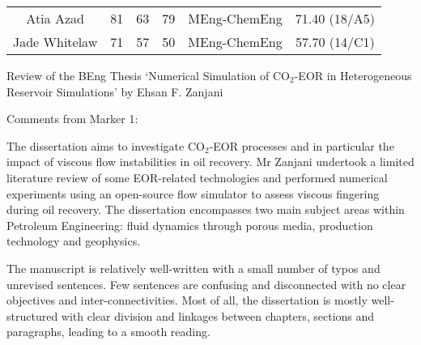\documentclass[14pt,twoside]{report}
\begin{document}
{\begin{landscape}
\begin{tabular}{||c| c c c |c| c||}
Atia Azad                  &        81                    &               63                          &         79                &   MEng-ChemEng   &   71.40 (18/A5)  \\
Jade Whitelaw              &        71                    &               57                          &         50                &   MEng-ChemEng   &   57.70 (14/C1)  \\
\hline\hline
\end{tabular}
    \end{landscape}
    \clearpage%
}




\vfill

\clearpage





\bigskip

\begin{center}
  {\Large Review of the BEng Thesis `Numerical Simulation of CO$_{2}$-EOR in Heterogeneous Reservoir Simulations' by Ehsan F. Zanjani}
\end{center}

\noindent
    {\Large Comments from Marker 1:}
    
The dissertation aims to investigate CO$_{2}$-EOR processes and in particular the impact of viscous flow instabilities in oil recovery. Mr Zanjani undertook a limited literature review of some EOR-related technologies and performed numerical experiments using an open-source flow simulator to assess viscous fingering during oil recovery. The dissertation encompasses two main subject areas within Petroleum Engineering: fluid dynamics through porous media, production technology and geophysics.

The manuscript is relatively well-written with a small number of typos and unrevised sentences. Few sentences are confusing and disconnected with no clear objectives and inter-connectivities. Most of all, the dissertation is mostly well-structured with clear division and linkages between chapters, sections and paragraphs, leading to a smooth reading.
\end{document}
